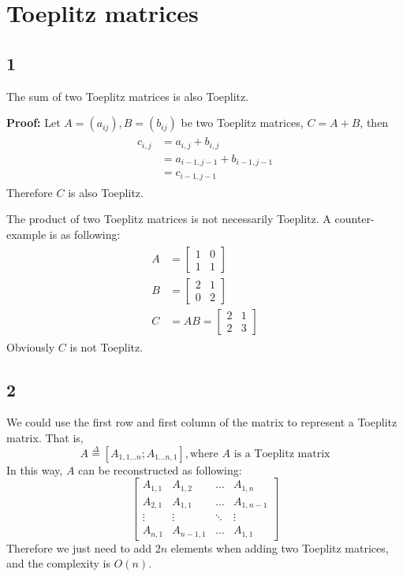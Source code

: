 \documentclass[paper=a4, fontsize=11pt]{scrartcl} %
\numberwithin{equation}{section} %
\numberwithin{figure}{section} %
\numberwithin{table}{section} %
\numberwithin{claimcounter}{section}
\begin{document}
\section{Toeplitz matrices}
\subsection*{1}
The sum of two Toeplitz matrices is also Toeplitz.

\textbf{Proof:}
Let $A = (a_{ij}), B = (b_{ij})$ be two Toeplitz matrices, $C = A + B$, then
\begin{align}
  \begin{split}
    c_{i,j} &= a_{i,j} + b_{i,j} \\
           &= a_{i-1,j-1} + b_{i-1,j-1} \\
           &= c_{i-1,j-1} 
  \end{split}
\end{align}
Therefore $C$ is also Toeplitz.

The product of two Toeplitz matrices is not necessarily Toeplitz. A
counter-example is as following:
\begin{align}
  \begin{split}
    A &= \begin{bmatrix}
      1 & 0 \\
      1 & 1 
    \end{bmatrix} \\
    B &= \begin{bmatrix}
      2 & 1 \\
      0 & 2 
    \end{bmatrix} \\
    C &= AB = \begin{bmatrix}
      2 & 1 \\
      2 & 3 
    \end{bmatrix}
  \end{split}
\end{align}
Obviously $C$ is not Toeplitz.

\subsection*{2}
We could use the first row and first column of the matrix to represent a
Toeplitz matrix. That is,
\begin{equation}
  A \overset{\Delta}{=} [A_{1, 1...n}; A_{1...n, 1}], \text{where $A$ is a
  Toeplitz matrix}
\end{equation}
In this way, $A$ can be reconstructed as following:
\[
\begin{bmatrix}
  A_{1,1} & A_{1, 2} & \dots & A_{1, n} \\
  A_{2,1} & A_{1, 1} & \dots & A_{1, n-1} \\
  \vdots & \vdots  & \ddots & \vdots \\
  A_{n,1} & A_{n-1, 1} & \dots & A_{1,1}
\end{bmatrix}
\]
Therefore we just need to add $2n$ elements when adding two Toeplitz
matrices, and the complexity is $O(n)$.
\end{document}
